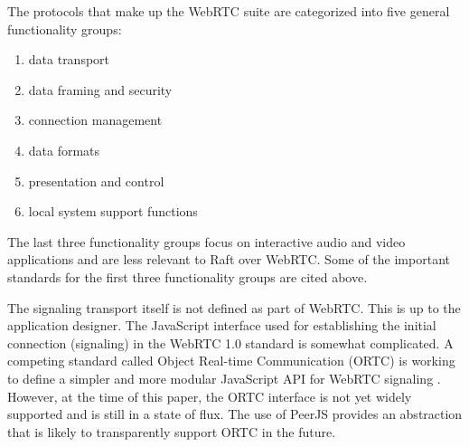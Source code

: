 \documentclass[conference,compsoc]{./IEEEtran/IEEEtran}
\begin{document}
The protocols that make up the WebRTC suite are categorized into
five general functionality groups:

\begin{enumerate}
    \item data transport
        \ifdefined\OPTIONAL
        \\
        \cite{draft-rtcweb-transports}
        \cite{draft-rtcweb-qos}
        \cite{RFC4960:sctp}
        \cite{RFC3758:sctp-reliability}
        \cite{draft-sctp-dtls-encaps}
        \cite{draft-mmusic-sctp-sdp}
        \cite{draft-sctp-ndata}
        \cite{draft-rtcweb-rtp-usage}
        \cite{draft-rtcweb-data-channel}
        \cite{draft-rtcweb-data-protocol}
        \cite{draft-rtcweb-alpn}
        \cite{RFC5245:ice}
        \cite{RFC5128:p2p-nat}
        \cite{RFC5389:stun}
        \cite{RFC3489:stun-udp}
        \cite{RFC5766:turn}
        \cite{RFC6156:turn-ipv6}
        \cite{RFC6544:tcp-ice}
        \cite{RFC4571:rtp-rtcp}
        \cite{RFC5764:dtls-srtp}
        \fi
    \item data framing and security
        \ifdefined\OPTIONAL
        \\
        \cite{RFC3550:rtp}
        \cite{RFC3711:srtp}
        \cite{draft-rtcweb-rtp-usage}
        \cite{draft-rtcweb-data-channel}
        \cite{draft-rtcweb-data-protocol}
        \fi
    \item connection management
        \ifdefined\OPTIONAL
        \\
        \cite{RFC2327:sdp}
        \cite{RFC3264:sdp-offer-answer}
        \cite{draft-rtcweb-jsep}
        \cite{RFC5245:ice}
        \cite{draft-mmusic-trickle-ice}
        \cite{RFC5763:srtp-using-dtls}
        \fi
    \item data formats
    \item presentation and control
    \item local system support functions
\end{enumerate}

The last three functionality groups focus on interactive audio and video
applications and are less relevant to Raft over WebRTC. \ifdefined\OPTIONAL
Some of the important standards for the first three functionality
groups are cited above. \fi

The signaling transport itself is not defined as part of WebRTC.
This is up to the application designer. The JavaScript interface used
for establishing the initial connection (signaling) in the WebRTC 1.0
standard is somewhat complicated. A competing standard called Object
Real-time Communication (ORTC) is working to define a simpler and more
modular JavaScript API for WebRTC signaling \cite{ortc2014}. However,
at the time of this paper, the ORTC interface is not yet widely
supported and is still in a state of flux. The use of PeerJS provides an
abstraction that is likely to transparently support ORTC in the future.
\end{document}
